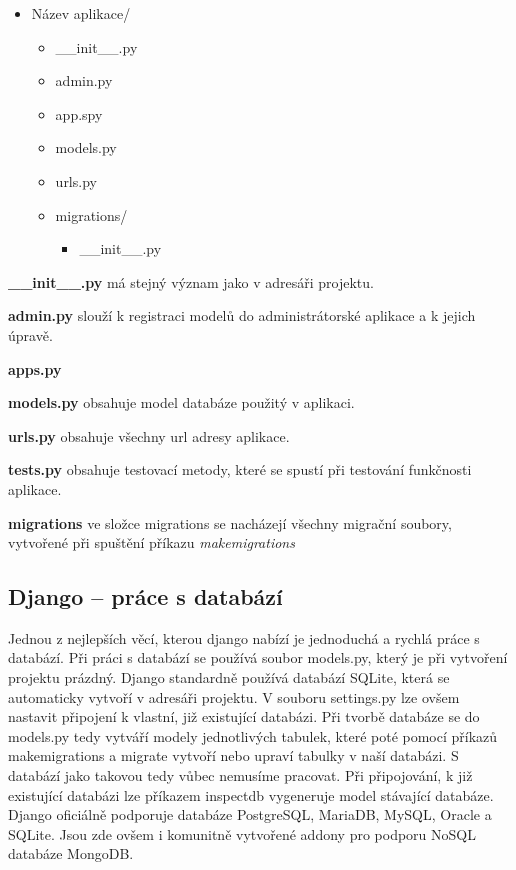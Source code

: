 \begin{itemize}
	\item \lbrack Název aplikace\rbrack /
 	\begin{itemize}
 		\item \_\_init\_\_.py
		\item admin.py
		\item app.spy
		\item models.py
		\item urls.py
		\item \lbrack migrations\rbrack /
		\begin{itemize}
			\item \_\_init\_\_.py
		\end{itemize}
	\end{itemize}
\end{itemize}

\vspace{9px}

\textbf{\_\_init\_\_.py} má stejný význam jako v adresáři projektu. 
\vspace{6px}

\textbf{admin.py} slouží k registraci modelů do administrátorské aplikace a k jejich úpravě.
\vspace{6px}

\textbf{apps.py} 
\vspace{6px}

\textbf{models.py} obsahuje model databáze použitý v aplikaci.
\vspace{6px}

\textbf{urls.py} obsahuje všechny url adresy aplikace.
\vspace{6px}

\textbf{tests.py} obsahuje testovací metody, které se spustí při testování funkčnosti aplikace.
\vspace{6px}

\textbf{migrations} ve složce migrations se nacházejí všechny migrační soubory, vytvořené při spuštění příkazu \textit{makemigrations}

\newpage

\subsection{Django – práce s databází}

Jednou z nejlepších věcí, kterou django nabízí je jednoduchá a rychlá práce s databází. Při práci s databází se používá soubor models.py, který je při vytvoření projektu prázdný. Django standardně používá databází SQLite, která se automaticky vytvoří v adresáři projektu. V souboru settings.py lze ovšem nastavit připojení k vlastní, již existující databázi. Při tvorbě databáze se do models.py tedy vytváří modely jednotlivých tabulek, které poté pomocí příkazů makemigrations a migrate vytvoří nebo upraví tabulky v naší databázi. S databází jako takovou tedy vůbec nemusíme pracovat. Při připojování, k již existující databázi lze příkazem inspectdb vygeneruje model stávající databáze. Django oficiálně podporuje databáze PostgreSQL, MariaDB, MySQL, Oracle a SQLite. Jsou zde ovšem i komunitně vytvořené addony pro podporu NoSQL databáze MongoDB.

